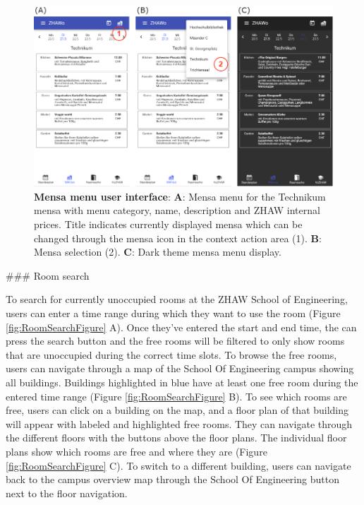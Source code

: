 \begin{markdown}
\begin{figure}[H]
  \includegraphics[width=16cm, center]{./figures/menu_figure.png}
  \captionsetup{width=15.5cm}
  \caption[Mensa menu user interface]{\textbf{Mensa menu user interface}: \textbf{A}: Mensa menu for the Technikum mensa with menu category, name, description and ZHAW internal prices. Title indicates currently displayed mensa which can be changed through the mensa icon in the context action area (1). \textbf{B}: Mensa selection (2). \textbf{C}: Dark theme mensa menu display.}
  \label{fig:MenuFigure}
\end{figure}

### Room search

To search for currently unoccupied rooms at the ZHAW School of Engineering, users can enter a time range during which they want to use the room (Figure \ref{fig:RoomSearchFigure} A). Once they've entered the start and end time, the can press the search button and the free rooms will be filtered to only show rooms that are unoccupied during the correct time slots. To browse the free rooms, users can navigate through a map of the School Of Engineering campus showing all buildings. Buildings highlighted in blue have at least one free room during the entered time range (Figure \ref{fig:RoomSearchFigure} B). To see which rooms are free, users can click on a building on the map, and a floor plan of that building will appear with labeled and highlighted free rooms. They can navigate through the different floors with the buttons above the floor plans. The individual floor plans show which rooms are free and where they are (Figure \ref{fig:RoomSearchFigure} C). To switch to a different building, users can navigate back to the campus overview map through the School Of Engineering button next to the floor navigation.


\end{markdown}

